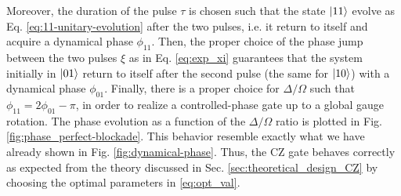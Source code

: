 \documentclass[rmp,10pt,onecolumn,fleqn,notitlepage]{revtex4-1}
\begin{document}
Moreover, the duration of the pulse $\tau$ is chosen such that the state $\left\vert{11}\right\rangle$ evolve as Eq.  \eqref{eq:11-unitary-evolution} after the two pulses, i.e. it return to itself and acquire a dynamical phase $\phi_{11}$. Then, the proper choice of the phase jump between the two pulses $\xi$ as in Eq. \eqref{eq:exp_xi} guarantees that the system initially in $\left\vert{01}\right\rangle$ return to itself after the second pulse (the same for $\left\vert{10}\right\rangle$) with a dynamical phase $\phi_{01}$.
Finally, there is a proper choice for $\Delta/\Omega$ such that $\phi_{11}=2\phi_{01}-\pi$, in order to realize a controlled-phase gate up to a global gauge rotation.
The phase evolution as a function of the $\Delta/\Omega$ ratio is plotted in Fig. \ref{fig:phase_perfect-blockade}. This behavior resemble exactly what we have already shown in Fig. \ref{fig:dynamical-phase}. Thus, the CZ gate behaves correctly as expected from the theory discussed in Sec. \ref{sec:theoretical_design_CZ} by choosing the optimal parameters in \eqref{eq:opt_val}. 
\end{document}
